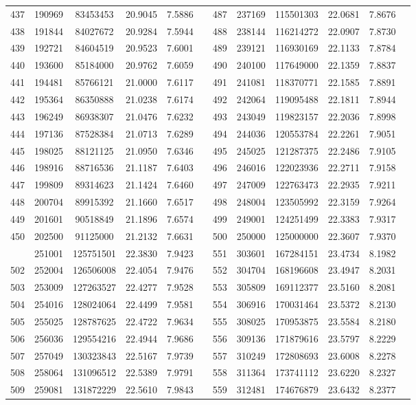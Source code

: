 \begin{longtable}{SSSSSSSSSSSS}
437&190969&83453453&20.9045&7.5886&&487&237169&115501303&22.0681&7.8676\\
438&191844&84027672&20.9284&7.5944&&488&238144&116214272&22.0907&7.8730\\
439&192721&84604519&20.9523&7.6001&&489&239121&116930169&22.1133&7.8784\\
440&193600&85184000&20.9762&7.6059&&490&240100&117649000&22.1359&7.8837\\
441&194481&85766121&21.0000&7.6117&&491&241081&118370771&22.1585&7.8891\\
442&195364&86350888&21.0238&7.6174&&492&242064&119095488&22.1811&7.8944\\
443&196249&86938307&21.0476&7.6232&&493&243049&119823157&22.2036&7.8998\\
444&197136&87528384&21.0713&7.6289&&494&244036&120553784&22.2261&7.9051\\
445&198025&88121125&21.0950&7.6346&&495&245025&121287375&22.2486&7.9105\\
446&198916&88716536&21.1187&7.6403&&496&246016&122023936&22.2711&7.9158\\
447&199809&89314623&21.1424&7.6460&&497&247009&122763473&22.2935&7.9211\\
448&200704&89915392&21.1660&7.6517&&498&248004&123505992&22.3159&7.9264\\
449&201601&90518849&21.1896&7.6574&&499&249001&124251499&22.3383&7.9317\\
450&202500&91125000&21.2132&7.6631&&500&250000&125000000&22.3607&7.9370\\
&251001&125751501&22.3830&7.9423&&551&303601&167284151&23.4734&8.1982\\
502&252004&126506008&22.4054&7.9476&&552&304704&168196608&23.4947&8.2031\\
503&253009&127263527&22.4277&7.9528&&553&305809&169112377&23.5160&8.2081\\
504&254016&128024064&22.4499&7.9581&&554&306916&170031464&23.5372&8.2130\\
505&255025&128787625&22.4722&7.9634&&555&308025&170953875&23.5584&8.2180\\
506&256036&129554216&22.4944&7.9686&&556&309136&171879616&23.5797&8.2229\\
507&257049&130323843&22.5167&7.9739&&557&310249&172808693&23.6008&8.2278\\
508&258064&131096512&22.5389&7.9791&&558&311364&173741112&23.6220&8.2327\\
509&259081&131872229&22.5610&7.9843&&559&312481&174676879&23.6432&8.2377\\

\end{longtable}
